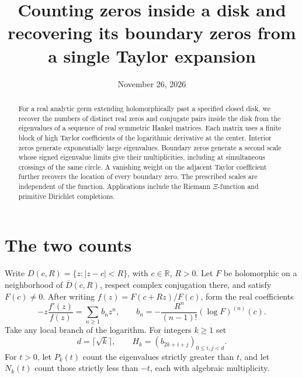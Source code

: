 \documentclass[11pt]{article}
\title{Counting zeros inside a disk and recovering its boundary zeros from a single Taylor expansion}
\author{}
\date{November 26, 2026}
\begin{document}
\maketitle
\begin{abstract}
For a real analytic germ extending holomorphically past a specified closed disk, we recover the numbers of distinct real zeros and conjugate pairs inside the disk from the eigenvalues of a sequence of real symmetric Hankel matrices. Each matrix uses a finite block of high Taylor coefficients of the logarithmic derivative at the center. Interior zeros generate exponentially large eigenvalues. Boundary zeros generate a second scale whose signed eigenvalue limits give their multiplicities, including at simultaneous crossings of the same circle. A vanishing weight on the adjacent Taylor coefficient further recovers the location of every boundary zero. The prescribed scales are independent of the function. Applications include the Riemann $\Xi$-function and primitive Dirichlet completions.
\end{abstract}

\section{The two counts}
Write $D(c,R)=\{z:|z-c|<R\}$, with $c\in\mathbb R$, $R>0$.
Let $F$ be holomorphic on a neighborhood of $\overline D(c,R)$, respect complex conjugation there, and satisfy $F(c)\ne0$.
After writing $f(z)=F(c+Rz)/F(c)$, form the real coefficients
\begin{equation}
 -z\frac{f'(z)}{f(z)}=\sum_{n\ge1} b_n z^n,\qquad
 b_n=-\frac{R^n}{(n-1)!}(\log F)^{(n)}(c).
 \label{eq:b}
\end{equation}
Take any local branch of the logarithm. For integers $k\ge1$ set
\begin{equation}
 d=\lceil\sqrt{k}\rceil,\qquad H_k=(b_{2k+i+j})_{0\le i,j<d}.
 \label{eq:h}
\end{equation}
For $t>0$, let $P_k(t)$ count the eigenvalues strictly greater than $t$, and let $N_k(t)$ count those strictly less than $-t$, each with algebraic multiplicity.
\end{document}
